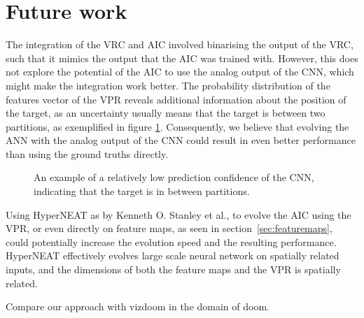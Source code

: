\section{Future work}
\label{sec:futurework}
The integration of the VRC and AIC involved binarising the output of the VRC, such that it mimics the output that the AIC was trained with. However, this does not explore the potential of the AIC to use the analog output of the CNN, which might make the integration work better. The probability distribution of the features vector of the VPR reveals additional information about the position of the target, as an uncertainty usually means that the target is between two partitions, as exemplified in figure \ref{fig:uncertain}. Consequently, we believe that evolving the ANN with the analog output of the CNN could result in even better performance than using the ground truths directly.

\begin{figure}[H]
	\centering
	\begin{scriptsize}
		\sffamily
		
	\end{scriptsize}
	\caption[An example of uncertain classification]{An example of a relatively low prediction confidence of the CNN, indicating that the target is in between partitions.}
	\label{fig:uncertain}
\end{figure}

Using HyperNEAT as by Kenneth O. Stanley et al.\cite{DBLP:journals/alife/StanleyDG09}, to evolve the AIC using the VPR, or even directly on feature maps, as seen in section~\ref{sec:featuremaps}, could potentially increase the evolution speed and the resulting performance. HyperNEAT effectively evolves large scale neural network on spatially related inputs, and the dimensions of both the feature maps and the VPR is spatially related.

Compare our approach with vizdoom in the domain of doom.